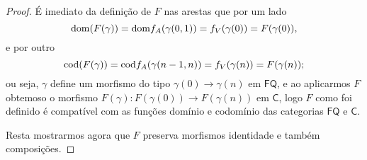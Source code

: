 \begin{proof}
    É imediato da definição de $F$ nas arestas que por um lado
    \begin{displaymath}
        \mathrm{dom}(F(\gamma)) = \mathrm{dom} f_A(\gamma(0,1)) = f_V(\gamma(0)) = F(\gamma(0)),
    \end{displaymath}
    e por outro
    \begin{displaymath}
        \mathrm{cod}(F(\gamma)) = \mathrm{cod} f_A(\gamma(n-1,n)) = f_V(\gamma(n)) = F(\gamma(n));
    \end{displaymath}
    ou seja, $\gamma$ define um morfismo do tipo $\gamma(0) \to \gamma(n)$ em $\mathsf{FQ}$, e ao aplicarmos $F$ obtemoso o morfismo $F(\gamma): F(\gamma(0)) \to F(\gamma(n))$ em $\mathsf{C}$, logo $F$ como foi definido é compatível com as funções domínio e codomínio das categorias $\mathsf{FQ}$ e $\mathsf{C}$.

    Resta mostrarmos agora que $F$ preserva morfismos identidade e também composições.
\end{proof}